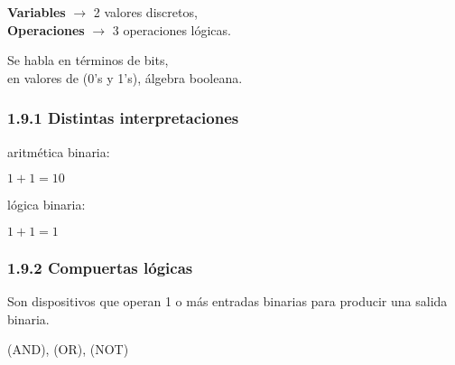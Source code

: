 \begin{center} \textbf{Variables} $\rightarrow$ 2 valores discretos, \\
    \textbf{Operaciones} $\rightarrow$ 3 operaciones l\'{o}gicas. \end{center}
\medbreak

\begin{flushleft} Se habla en t\'{e}rminos de bits, \\ en valores de (0's y
    1's), \'{a}lgebra booleana. \end{flushleft} \medbreak

\begin{center}  \end{center}

\subsubsection*{1.9.1 Distintas interpretaciones} \begin{flushleft}
    aritm\'{e}tica binaria: \\ \begin{center} $1 + 1 = 10$ \end{center}

    l\'{o}gica binaria: \\ \begin{center} $1 + 1 = 1$ \end{center} \end{flushleft}

\subsubsection*{1.9.2 Compuertas l\'{o}gicas} Son dispositivos que operan 1 o
m\'{a}s entradas binarias para producir una salida binaria.

\begin{center} (AND), (OR), (NOT) \end{center}
